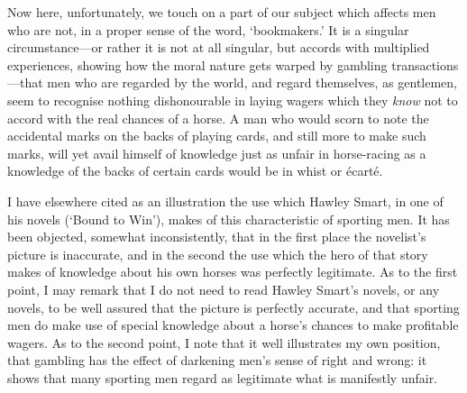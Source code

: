 \documentclass[letterpaper,12pt,oneside,openany]{memoir}
\begin{document}
Now here, unfortunately, we touch on a part of our
subject which affects men who are not, in a proper sense
of the word, `bookmakers.' It is a singular
circumstance---or rather it is not at all singular, but accords
with multiplied experiences, showing how the moral
nature gets warped by gambling transactions---that
men who are regarded by the world, and regard themselves,
as gentlemen, seem to recognise nothing dishonourable
in laying wagers which they \textit{know} not to
accord with the real chances of a horse. A man who
would scorn to note the accidental marks on the backs
of playing cards, and still more to make such marks,
will yet avail himself of knowledge just as unfair in
horse-racing as a knowledge of the backs of certain
cards would be in whist or \'ecart\'e.

I have elsewhere cited as an illustration the use
which Hawley Smart, in one of his novels (`Bound to
Win'), makes of this characteristic of sporting men.
It has been objected, somewhat inconsistently, that in
the first place the novelist's picture is inaccurate, and
in the second the use which the hero of that story makes
of knowledge about his own horses was perfectly legitimate.
As to the first point, I may remark that I do
not need to read Hawley Smart's novels, or any novels,
to be well assured that the picture is perfectly accurate,
and that sporting men do make use of special knowledge
about a horse's chances to make profitable wagers.
As to the second point, I note that it well illustrates
my own position, that gambling has the effect of
darkening men's sense of right and wrong: it shows
that many sporting men regard as legitimate what is
manifestly unfair.
\end{document}
